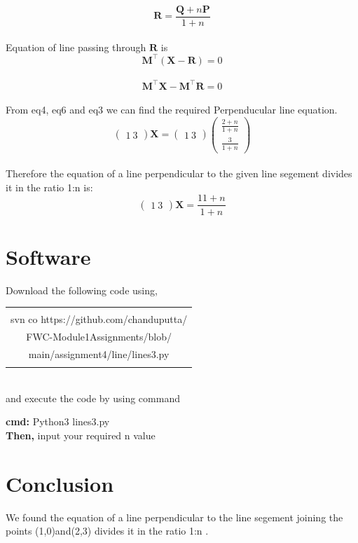 \documentclass[journal,12pt,twocolumn]{article}
\newcommand{\myvec}[1]{\ensuremath{\begin{pmatrix}#1\end{pmatrix}}}
\let\vec\mathbf
\begin{document}
 \begin{equation}
	 \vec{R}=\frac{\vec{Q}+n\vec{P}}{1+n}
	 \label{eq-4}
\end{equation}
 \\
Equation of line passing through ${\vec{R}}$ is\\
\begin{equation}
	\vec{M^{\top}}(\vec{X}-\vec{R})=0
	 \label{eq-4}
\end{equation}
\\
\begin{equation}
	 \vec{M^{\top}}
	 \vec{X} - \vec{M^{\top}}
	 \vec{R} = 0
	 \label{eq-5}
\end{equation}
 \\
 From eq4, eq6 and eq3 we can find the required Perpenducular line equation. 
 \begin{equation}
	   \myvec{
  1\  3}\vec{X}
	 = \myvec{
  1\ 3}\myvec{
  \frac{2+n}{1+n}\\
  \frac{3}{1+n}} 
  \label{eq-5}
\end{equation}
\\
Therefore the equation of a line perpendicular to the given line segement divides it in the ratio 1:n is:
 \begin{equation}
	   \myvec{
  1\  3}\vec{X}
	 = \frac{11+n}{1+n} 
  \label{eq-5}
\end{equation}



 
\section{Software}
Download the following code using,
\begin{table}[h]
    \centering
    \begin{tabular}{|c|}
    \hline \\
         svn co https://github.com/chanduputta/ \\FWC-Module1Assignments/blob/\\main/assignment4/line/lines3.py  \\
         \\
\hline
    \end{tabular}
\end{table}
\\
and execute the code by using command
\begin{center}
	\textbf{cmd:}
{Python3  lines3.py}\\
	\textbf{Then,}
{input your required n value}
\end{center}

\section{Conclusion}
\begin{center}
We found the equation of a line perpendicular to the line segement joining the points (1,0)and(2,3) divides it in the ratio 1:n .
\end{center}
\end{document}
